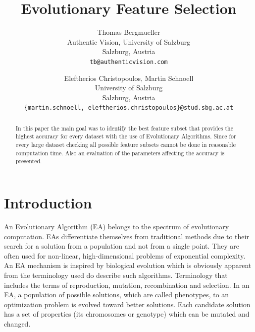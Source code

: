 \documentclass[11pt,onecolumn,a4paper]{article}
\begin{document}
\title{Evolutionary Feature Selection}

\author{Thomas Bergmueller\\
Authentic Vision, University of Salzburg\\
Salzburg, Austria\\
{\tt\small tb@authenticvision.com}
\and
Eleftherios Christopoulos, Martin Schnoell\\
University of Salzburg\\
Salzburg, Austria\\
{\tt\small \{martin.schnoell, eleftherios.christopoulos\}@stud.sbg.ac.at}
}



\maketitle
\thispagestyle{empty}
\newpage
\begin{abstract}
   In this paper the main goal was to identify the best feature subset that provides the highest accuracy for every dataset with the use of Evolutionary Algorithms. Since for every large dataset checking all possible feature subsets cannot be done in reasonable computation time. Also an evaluation of the parameters affecting the accuracy is presented.
\end{abstract}
\newpage
\section{Introduction}
\label{l}
An Evolutionary Algorithm (EA) belongs to the spectrum of evolutionary computation. EAs differentiate themselves from traditional methods due to their search for a solution from a population and not from a single point. They are often used for non-linear, high-dimensional problems of exponential complexity. An EA mechanism is inspired by biological evolution which is obviously apparent from the terminology used do describe such algorithms. Terminology that includes the terms of reproduction, mutation, recombination and selection. 
In an EA, a population of possible solutions, which are called phenotypes, to an optimization problem is evolved toward better solutions. Each candidate solution has a set of properties (its chromosomes or genotype) which can be mutated and changed. \cite{dan1} 
\end{document}
